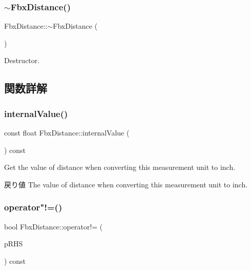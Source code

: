 \subsubsection{\texorpdfstring{$\sim$\+Fbx\+Distance()}{~FbxDistance()}}
{\footnotesize\ttfamily Fbx\+Distance\+::$\sim$\+Fbx\+Distance (\begin{DoxyParamCaption}{ }\end{DoxyParamCaption})}



Destructor. 



\subsection{関数詳解}
\mbox{\label{class_fbx_distance_a4a54ec421849ca6e2e43cfb400adbfc0}} 
\subsubsection{\texorpdfstring{internal\+Value()}{internalValue()}}
{\footnotesize\ttfamily const float Fbx\+Distance\+::internal\+Value (\begin{DoxyParamCaption}{ }\end{DoxyParamCaption}) const}

Get the value of distance when converting this measurement unit to inch. \begin{DoxyReturn}{戻り値}
The value of distance when converting this measurement unit to inch. 
\end{DoxyReturn}
\mbox{\label{class_fbx_distance_a71b53170c900475723294c6257ebd861}} 
\subsubsection{\texorpdfstring{operator"!=()}{operator!=()}}
{\footnotesize\ttfamily bool Fbx\+Distance\+::operator!= (\begin{DoxyParamCaption}\item[{const \hyperlink{class_fbx_distance}{Fbx\+Distance} \&}]{p\+R\+HS }\end{DoxyParamCaption}) const}


